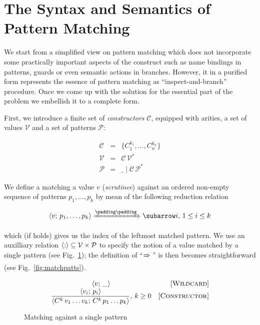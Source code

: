 \section{The Syntax and Semantics of Pattern Matching}

We start from a simplified view on pattern matching which does not incorporate some practically important aspects of the construct such as
name bindings in patterns, guards or even semantic actions in branches. However, it in a purified form represents the essence of pattern
matching as ``inspect-and-branch'' procedure. Once we come up with the solution for the essential part of the problem we embellish it to
a complete form.

First, we introduce a finite set of \emph{constructors} $\mathcal C$, equipped with arities, a set of values $\mathcal{V}$
and a set of patterns $\mathcal{P}$:
 
\[
 \begin{array}{rcll}
    \mathcal{C} & = & \{ C_1^{k_1}, \dots, C_n^{k_n} \}\\
    \mathcal{V} & = & \mathcal{C}\,\mathcal{V}^*\\  
    \mathcal{P} & = & \_ \mid \mathcal{C}\,\mathcal{P}^*
 \end{array}
\]

We define a matching a value $v$ (\emph{scrutinee}) against an ordered non-empty sequence of patterns $p_1,\dots,p_k$ by mean of the following
reduction relation

\[
\setarrow{\xRightarrow}
\trans{\inbr{v;\,p_1,\dots,p_k}}{}{i},\,1\le i\le k
\]

which (if holds) gives us the index of the leftmost matched pattern. We use an auxilliary relation $\left<{;}\right>\subseteq\mathcal{V}\times\mathcal{P}$
to specify the notion of a value matched by a single pattern (see Fig.~\ref{fig:match1pat}); the definition of ``$\xRightarrow{}{}$'' is then becomes
straightforward (see Fig.~\ref{fig:matchpatts}).

\begin{figure}
   \renewcommand*{\arraystretch}{2}
   \[
   \begin{array}{cr}
     \left<{v;\,\_}\right> & \mbox{[\textsc{Wildcard}]} \\
     \dfrac{\left<{v_i;\,p_i}\right>}{\left<{C^k\,v_1\dots v_k;\,C^k\,p_1\dots p_k}\right>},\,k\ge 0 & \mbox{[\textsc{Constructor}]}
   \end{array}
   \]
   \caption{Matching against a single pattern}
   \label{fig:match1pat}
\end{figure}

